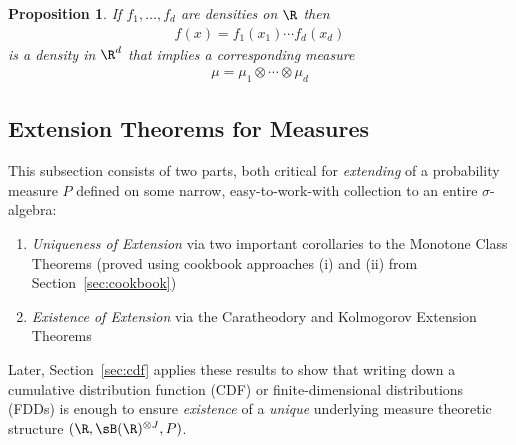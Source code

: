 \documentclass[12pt]{article}
\theoremstyle{plain}
\newtheorem{prop}[thm]{Proposition}
\theoremstyle{definition}
\theoremstyle{remark}
\begin{document}
\begin{prop}
If $f_1,\ldots,f_d$ are densities on $\R$ then
\begin{align*}
  f(x) = f_1(x_1) \cdots f_d(x_d)
\end{align*}
is a density in $\R^d$ that implies a corresponding measure
\begin{align*}
  \mu = \mu_1\otimes \cdots \otimes \mu_d
\end{align*}
\end{prop}


\clearpage
\subsection{Extension Theorems for Measures}
\label{sec:extension}

This subsection consists of two parts, both critical for
\emph{extending} of a probability measure $P$ defined on some narrow,
easy-to-work-with collection to an entire $\sigma$-algebra:
\begin{enumerate}[label=(\roman*)]
  \item \emph{Uniqueness of Extension} via two important corollaries to
    the Monotone Class Theorems (proved using cookbook approaches (i)
    and (ii) from Section~\ref{sec:cookbook})
  \item \emph{Existence of Extension} via the Caratheodory and
    Kolmogorov Extension Theorems
\end{enumerate}
Later, Section~\ref{sec:cdf} applies these results to show that writing
down a cumulative distribution function (CDF) or finite-dimensional
distributions (FDDs) is enough to ensure \emph{existence} of a
\emph{unique} underlying measure theoretic structure
$(\R,\sB(\R)^{\otimes J},P)$.

\end{document}
